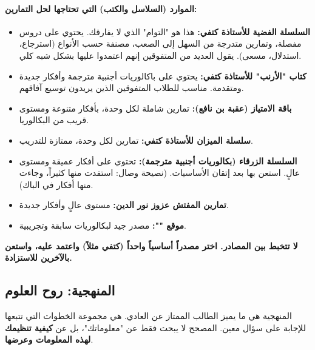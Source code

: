 \documentclass[12pt,a4paper]{book}
\newcommand{\importantAr}[1]{%
	\begin{important}
		\bfseries #1
	\end{important}
}
\begin{document}
	\paragraph{الموارد (السلاسل والكتب) التي تحتاجها لحل التمارين:}
	\begin{itemize}
		\item \textbf{السلسلة الفضية للأستاذة كتفي:} هذا هو "التوام" الذي لا يفارقك. يحتوي على دروس مفصلة، وتمارين متدرجة من السهل إلى الصعب، مصنفة حسب الأنواع (استرجاع، استدلال، مسعى). يقول العديد من المتفوقين إنهم اعتمدوا عليها بشكل شبه كلي.
		\item \textbf{كتاب "الأرنب" للأستاذة كتفي:} يحتوي على باكالوريات أجنبية مترجمة وأفكار جديدة ومتقدمة. مناسب للطلاب المتفوقين الذين يريدون توسيع آفاقهم.
		\item \textbf{باقة الامتياز (عقبة بن نافع):} تمارين شاملة لكل وحدة، بأفكار متنوعة ومستوى قريب من البكالوريا.
		\item \textbf{سلسلة الميزان للأستاذة كتفي:} تمارين لكل وحدة، ممتازة للتدريب.
		\item \textbf{السلسلة الزرقاء (بكالوريات أجنبية مترجمة):} تحتوي على أفكار عميقة ومستوى عالٍ. استعن بها بعد إتقان الأساسيات. (نصيحة وصال: استفدت منها كثيراً، وجاءت منها أفكار في الباك).
		\item \textbf{تمارين المفتش عزوز نور الدين:} مستوى عالٍ وأفكار جديدة.
		\item \textbf{موقع "":} مصدر جيد لبكالوريات سابقة وتجريبية.
	\end{itemize}
	
	\importantAr{لا تتخبط بين المصادر. اختر مصدراً أساسياً واحداً (كتفي مثلاً) واعتمد عليه، واستعن بالآخرين للاستزادة.}
	
	\subsection{المنهجية: روح العلوم}
	المنهجية هي ما يميز الطالب الممتاز عن العادي. هي مجموعة الخطوات التي تتبعها للإجابة على سؤال معين. المصحح لا يبحث فقط عن "معلوماتك"، بل عن \textbf{كيفية تنظيمك لهذه المعلومات وعرضها}.
	
\end{document}
